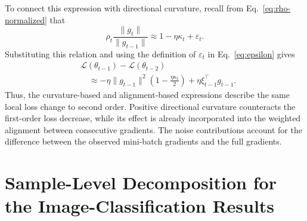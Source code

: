 To connect this expression with directional curvature,
recall from Eq.~\eqref{eq:rho-normalized} that
\begin{equation}
  \rho_t\frac{\|g_t\|}{\|g_{t-1}\|}
  \approx 1-\eta\kappa_t+\varepsilon_t.
\end{equation}
Substituting this relation and using the definition
of $\varepsilon_t$ in Eq.~\eqref{eq:epsilon} gives
\begin{equation}
\begin{aligned}
&\mathcal{L}(\theta_{t-1})-\mathcal{L}(\theta_{t-2})\\
&\quad\approx-\eta\|g_{t-1}\|^2
\left(1-\frac{\eta\kappa_t}{2}\right)
+\eta\xi_{t-1}^\top g_{t-1}.
\end{aligned}
\label{eq:appendix-loss-curvature}
\end{equation}
Thus, the curvature-based and alignment-based expressions
describe the same local loss change to second order.
Positive directional curvature counteracts the first-order
loss decrease, while its effect is already incorporated
into the weighted alignment between consecutive gradients.
The noise contributions account for the difference between
the observed mini-batch gradients and the full gradients.





\section{Sample-Level Decomposition for the Image-Classification Results}
\label{appendix:sample-level}

